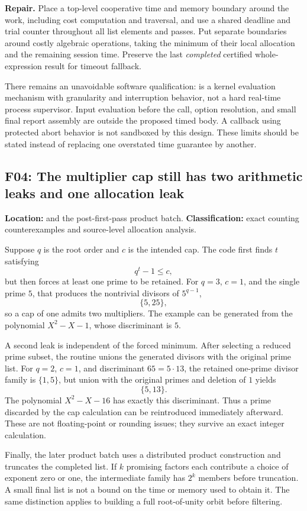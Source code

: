 \documentclass[11pt,letterpaper]{article}
\newcommand{\code}[1]{\texttt{\detokenize{#1}}}
\theoremstyle{definition}
\theoremstyle{remark}
\newcommand{\finding}[2]{\subsection{#1: #2}\label{f:#1}}
\begin{document}
\textbf{Repair.} Place a top-level cooperative time and memory boundary around the work, including cost computation and traversal, and use a shared deadline and trial counter throughout all list elements and passes. Put separate boundaries around costly algebraic operations, taking the minimum of their local allocation and the remaining session time. Preserve the last \emph{completed} certified whole-expression result for timeout fallback.

There remains an unavoidable software qualification: \code{TimeConstrained} is a kernel evaluation mechanism with granularity and interruption behavior, not a hard real-time process supervisor. Input evaluation before the call, option resolution, and small final report assembly are outside the proposed timed body. A callback using protected abort behavior is not sandboxed by this design. These limits should be stated instead of replacing one overstated time guarantee by another.\cite{timeconstrained}

\finding{F04}{The multiplier cap still has two arithmetic leaks and one allocation leak}

\textbf{Location:} \code{newMultipliers} and the post-first-pass product batch.
\textbf{Classification:} exact counting counterexamples and source-level allocation analysis.

Suppose $q$ is the root order and $c$ is the intended cap. The code first finds $t$ satisfying
\[
q^t-1\le c,
\]
but then forces at least one prime to be retained. For $q=3$, $c=1$, and the single prime $5$, that produces the nontrivial divisors of $5^{q-1}$,
\[
\{5,25\},
\]
so a cap of one admits two multipliers. The example can be generated from the polynomial $X^2-X-1$, whose discriminant is $5$.

A second leak is independent of the forced minimum. After selecting a reduced prime subset, the routine unions the generated divisors with the original prime list. For $q=2$, $c=1$, and discriminant $65=5\cdot13$, the retained one-prime divisor family is $\{1,5\}$, but union with the original primes and deletion of $1$ yields
\[
\{5,13\}.
\]
The polynomial $X^2-X-16$ has exactly this discriminant. Thus a prime discarded by the cap calculation can be reintroduced immediately afterward. These are not floating-point or rounding issues; they survive an exact integer calculation.

Finally, the later product batch uses a distributed product construction and truncates the completed list. If $k$ promising factors each contribute a choice of exponent zero or one, the intermediate family has $2^k$ members before truncation. A small final list is not a bound on the time or memory used to obtain it. The same distinction applies to building a full root-of-unity orbit before filtering.\cite{baseline}
\end{document}
